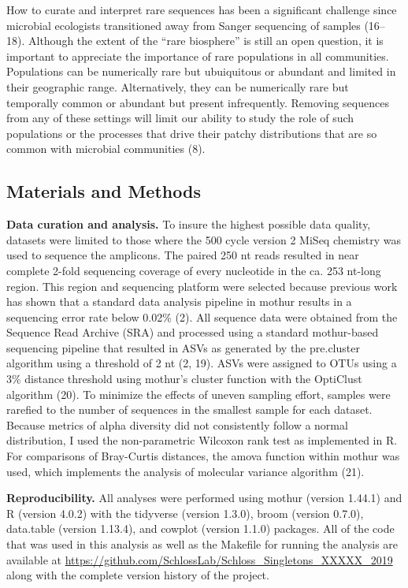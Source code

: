 \documentclass[
]{article}
\begin{document}
How to curate and interpret rare sequences has been a significant
challenge since microbial ecologists transitioned away from Sanger
sequencing of samples (16--18). Although the extent of the ``rare
biosphere'' is still an open question, it is important to appreciate the
importance of rare populations in all communities. Populations can be
numerically rare but ubuiquitous or abundant and limited in their
geographic range. Alternatively, they can be numerically rare but
temporally common or abundant but present infrequently. Removing
sequences from any of these settings will limit our ability to study the
role of such populations or the processes that drive their patchy
distributions that are so common with microbial communities (8).

\hypertarget{materials-and-methods}{%
\subsection{Materials and Methods}\label{materials-and-methods}}

\textbf{Data curation and analysis.} To insure the highest possible data
quality, datasets were limited to those where the 500 cycle version 2
MiSeq chemistry was used to sequence the amplicons. The paired 250 nt
reads resulted in near complete 2-fold sequencing coverage of every
nucleotide in the ca. 253 nt-long region. This region and sequencing
platform were selected because previous work has shown that a standard
data analysis pipeline in mothur results in a sequencing error rate
below 0.02\% (2). All sequence data were obtained from the Sequence Read
Archive (SRA) and processed using a standard mothur-based sequencing
pipeline that resulted in ASVs as generated by the pre.cluster algorithm
using a threshold of 2 nt (2, 19). ASVs were assigned to OTUs using a
3\% distance threshold using mothur's cluster function with the
OptiClust algorithm (20). To minimize the effects of uneven sampling
effort, samples were rarefied to the number of sequences in the smallest
sample for each dataset. Because metrics of alpha diversity did not
consistently follow a normal distribution, I used the non-parametric
Wilcoxon rank test as implemented in R. For comparisons of Bray-Curtis
distances, the amova function within mothur was used, which implements
the analysis of molecular variance algorithm (21).

\textbf{Reproducibility.} All analyses were performed using mothur
(version 1.44.1) and R (version 4.0.2) with the tidyverse (version
1.3.0), broom (version 0.7.0), data.table (version 1.13.4), and cowplot
(version 1.1.0) packages. All of the code that was used in this analysis
as well as the Makefile for running the analysis are available at
\url{https://github.com/SchlossLab/Schloss_Singletons_XXXXX_2019} along
with the complete version history of the project.
\end{document}
